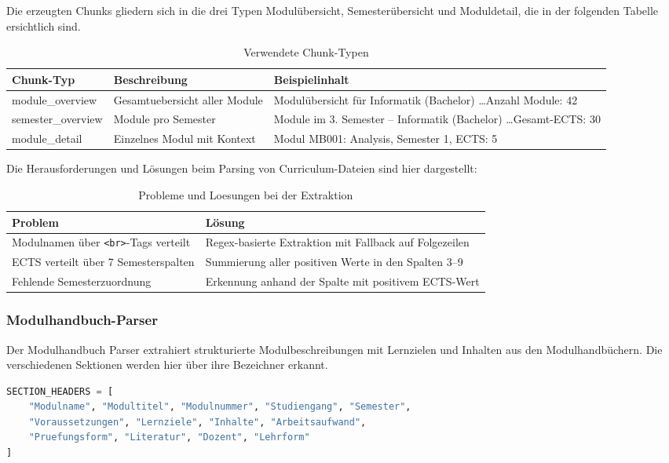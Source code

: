 Die erzeugten Chunks gliedern sich in die drei Typen Modulübersicht, Semesterübersicht und Moduldetail, die in der folgenden Tabelle ersichtlich sind. 

\begin{table}[htbp]
\centering
\begin{tabular}{|p{3.6cm}|p{4.8cm}|p{8.0cm}|}
\hline
\textbf{Chunk-Typ} & \textbf{Beschreibung} & \textbf{Beispielinhalt} \\
\hline
module\_overview & Gesamtuebersicht aller Module & Modulübersicht für Informatik (Bachelor) \dots Anzahl Module: 42 \\
semester\_overview & Module pro Semester & Module im 3. Semester -- Informatik (Bachelor) \dots Gesamt-ECTS: 30 \\
module\_detail & Einzelnes Modul mit Kontext & Modul MB001: Analysis, Semester 1, ECTS: 5 \\
\hline
\end{tabular}
\caption{Verwendete Chunk-Typen}
\label{tab:chunk_typen}
\end{table}

Die Herausforderungen und Lösungen beim Parsing von Curriculum-Dateien sind hier dargestellt:

\begin{table}[htbp]
\centering
\begin{tabular}{|p{8.0cm}|p{8.0cm}|}
\hline
\textbf{Problem} & \textbf{Lösung} \\
\hline
Modulnamen über \texttt{<br>}-Tags verteilt & Regex-basierte Extraktion mit Fallback auf Folgezeilen \\
ECTS verteilt über 7 Semesterspalten & Summierung aller positiven Werte in den Spalten 3--9 \\
Fehlende Semesterzuordnung & Erkennung anhand der Spalte mit positivem ECTS-Wert \\
\hline
\end{tabular}
\caption{Probleme und Loesungen bei der Extraktion}
\label{tab:probleme_loesungen}
\end{table}

\subsubsection{Modulhandbuch-Parser}
Der Modulhandbuch Parser extrahiert strukturierte Modulbeschreibungen mit Lernzielen und Inhalten aus den Modulhandbüchern. Die verschiedenen Sektionen werden hier  über ihre Bezeichner erkannt.

\begin{lstlisting}[language=Python, caption={Sektionen}]
SECTION_HEADERS = [
    "Modulname", "Modultitel", "Modulnummer", "Studiengang", "Semester",
    "Voraussetzungen", "Lernziele", "Inhalte", "Arbeitsaufwand",
    "Pruefungsform", "Literatur", "Dozent", "Lehrform"
]
\end{lstlisting}

